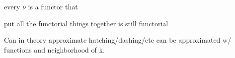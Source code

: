 \documentclass[../main.tex]{subfiles}
\begin{document}
every $\nu$ is a functor that

put all the functorial things together is still functorial 

















 Can in theory approximate hatching/dashing/etc can be approximated w/ functions and neighborhood of k. 
\end{document}
